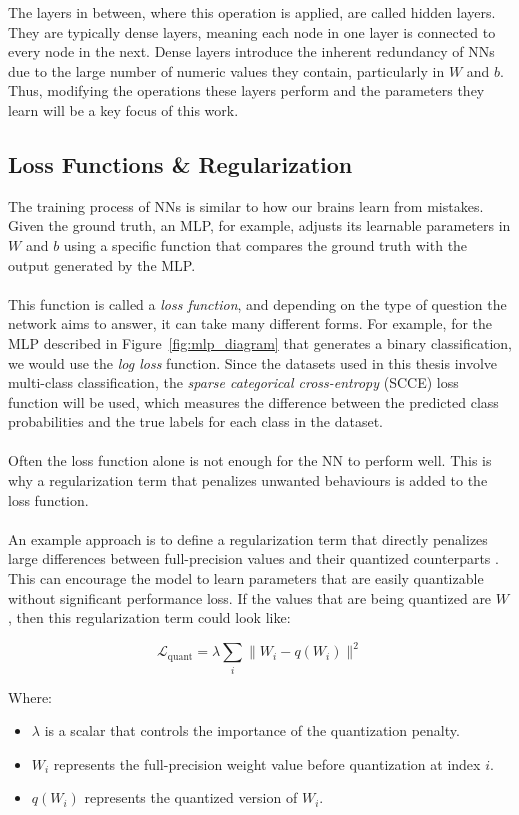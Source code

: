 \noindent The layers in between, where this operation is applied, are called hidden layers. 
They are typically dense layers, meaning each node in one layer is connected to every node in the next. 
Dense layers introduce the inherent redundancy of NNs due to the large number of numeric values they contain, 
particularly in \( W \) and \( b \). Thus, modifying the operations these layers perform 
and the parameters they learn will be a key focus of this work.

\subsection{Loss Functions \& Regularization}
\label{subsec:subsection2}
The training process of NNs is similar to how our brains learn from mistakes. 
Given the ground truth, an MLP, for example, adjusts its learnable parameters in \( W \) and \( b \)
using a specific function that compares the ground truth with the output generated by the MLP.
\\
\\
This function is called a \textit{loss function}, and depending on the type of question the network aims to answer, it can take many different forms.
For example, for the MLP described in Figure~\ref{fig:mlp_diagram} that generates a binary classification, we would use the \textit{log loss} function. 
Since the datasets used in this thesis involve multi-class classification, the \textit{sparse categorical cross-entropy} (SCCE) loss function will be used, 
which measures the difference between the predicted class probabilities and the true labels for each class in the dataset.
\\
\\
Often the loss function alone is not enough for the NN to perform well. This is why a regularization term that penalizes unwanted behaviours
is added to the loss function.
\\
\\
An example approach is to define a regularization term that directly penalizes large differences between full-precision values 
and their quantized counterparts \cite{zhuang2018towards}. This can encourage the model to learn parameters that are easily quantizable without significant performance loss.
If the values that are being quantized are \( W \), then this regularization term could look like:

\[
\mathcal{L}_{\text{quant}} = \lambda \sum_{i} \| W_i - q(W_i) \|^2
\]

\noindent Where:
\begin{itemize}
    \item \( \lambda \) is a scalar that controls the importance of the quantization penalty.
    \item \( W_i \) represents the full-precision weight value before quantization at index \( i \).
    \item \( q(W_i) \) represents the quantized version of \( W_i \).
\end{itemize}

